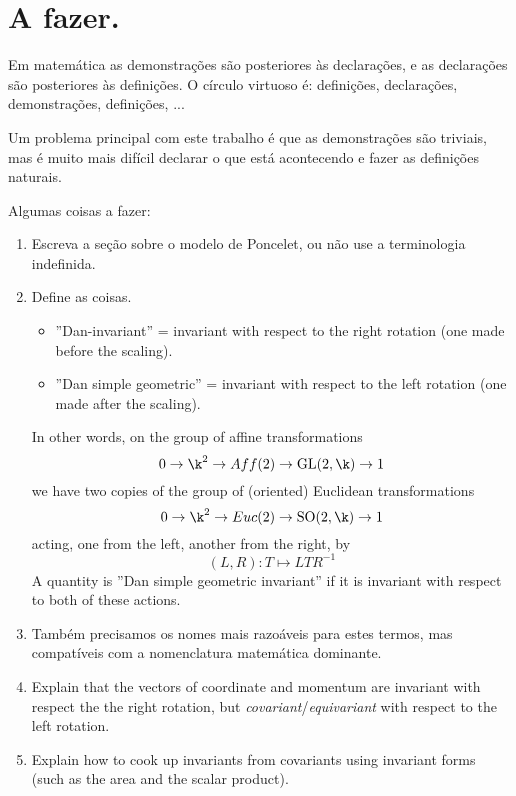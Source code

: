 \section{A fazer.}

Em matemática
as demonstrações são posteriores às declarações,
e as declarações são posteriores às definições.
O círculo virtuoso é:
 definições, declarações, demonstrações, definições, ...

Um problema principal com este trabalho é que as demonstrações
são triviais, mas é muito mais difícil
declarar o que está acontecendo
e fazer as definições naturais.

Algumas coisas a fazer:
\begin{enumerate}
\item Escreva a seção sobre o modelo de Poncelet, ou não use a terminologia indefinida.
\item Define as coisas.
 \begin{itemize}
 \item ''Dan-invariant'' = invariant with respect to the right rotation (one made before the scaling).
 \item ''Dan simple geometric'' = invariant with respect to the left rotation (one made after the scaling).
 \end{itemize}
In other words,
 on the group of affine transformations 
\begin{equation} \label{eq:affine-group}
0 \to \k^2 \to Aff(2) \to \GL(2,\k) \to 1
\end{equation}
we have two copies of the group of (oriented) Euclidean transformations
\begin{equation} \label{eq:euclidean-group}
0 \to \k^2 \to Euc(2) \to \SO(2,\k) \to 1
\end{equation}
acting, one from the left, another from the right, by
\begin{equation}
(L,R) : T \mapsto L T R^{-1}
\end{equation}
 A quantity is ''Dan simple geometric invariant''
  if it is invariant with respect to both of these actions.
\item Também precisamos os nomes mais razoáveis para estes termos,
mas compatíveis com a nomenclatura matemática dominante.
\item Explain that the vectors of coordinate and momentum are invariant with respect the the right rotation,
but \emph{covariant}/\emph{equivariant} with respect to the left rotation.
\item Explain how to cook up invariants from covariants using invariant forms (such as the area and the scalar product).
\end{enumerate}

